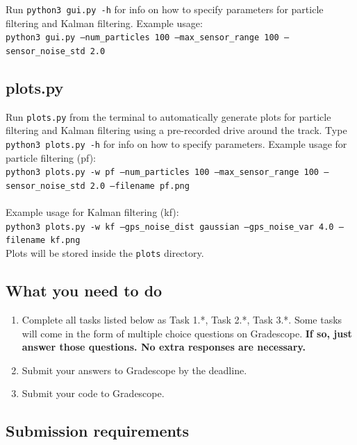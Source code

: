 \documentclass[a4paper]{article}
\theoremstyle{definition}
\theoremstyle{plain}
\begin{document}
\noindent
Run \texttt{python3 gui.py -h} for info on how to specify parameters for particle filtering and Kalman filtering. Example usage:\\

\texttt{python3 gui.py --num\_particles 100 --max\_sensor\_range 100 --sensor\_noise\_std 2.0}\\

\subsection*{plots.py}

Run \texttt{plots.py} from the terminal to automatically generate plots for particle filtering and Kalman filtering using a pre-recorded drive around the track. Type \texttt{python3 plots.py -h} for info on how to specify parameters. Example usage for particle filtering (pf):\\

\noindent
\texttt{python3 plots.py -w pf --num\_particles 100 --max\_sensor\_range 100 --sensor\_noise\_std 2.0 --filename pf.png}\\\\

Example usage for Kalman filtering (kf):\\

\texttt{python3 plots.py -w kf --gps\_noise\_dist gaussian --gps\_noise\_var 4.0 --filename kf.png}\\

Plots will be stored inside the \texttt{plots} directory.

\subsection*{What you need to do}

\begin{enumerate}
    \item Complete all tasks listed below as Task 1.*, Task 2.*, Task 3.*. Some tasks will come in the form of multiple choice questions on Gradescope. \textbf{If so, just answer those questions. No extra responses are necessary.}
    \item Submit your answers to Gradescope by the deadline.
    \item Submit your code to Gradescope.
\end{enumerate}

\subsection*{Submission requirements}
\end{document}
